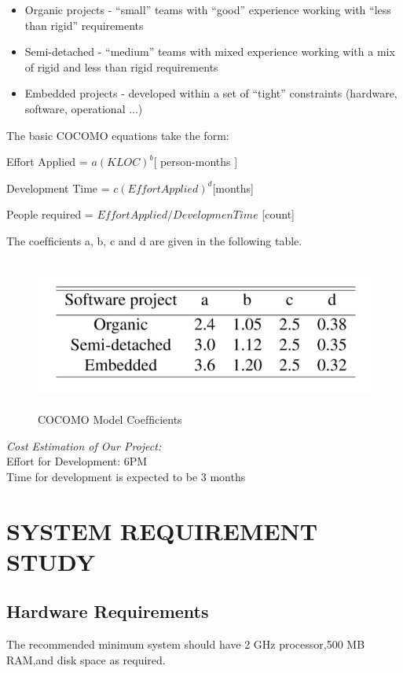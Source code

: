 \documentclass[12pt,a4paper,oneside]{report}
\newcommand{\quotes}[1]{``#1''}
\begin{document}
\begin{itemize}
\item Organic projects - \quotes{small} teams with \quotes{good} experience working with \quotes{less than rigid} requirements
\item Semi-detached - \quotes{medium} teams with mixed experience working with a mix of rigid and less than rigid requirements
\item Embedded projects - developed within a set of \quotes{tight} constraints (hardware, software, operational ...)
\end{itemize}
\par The basic COCOMO equations take the form:\\ 
\par Effort Applied = $a(KLOC)^b$[ person-months ]\\
\par Development Time = $c(EffortApplied)^d$[months]\\
\par People required = $Effort Applied / Developmen Time$ [count]\\
\par The coefﬁcients a, b, c and d are given in the following table.\\
\begin{figure}[h]
	\begin{center}
		\includegraphics[width=13cm,height=5cm]{cocomotable.jpg}
			\caption{ COCOMO Model Coefﬁcients}
			\label{ COCOMO Model Coefﬁcients}
	\end{center}
\end{figure}
\textit{Cost Estimation of Our Project:}\\
Effort for Development: 6PM \\
Time for development is expected to be 3 months\\
\section{SYSTEM REQUIREMENT STUDY}
\subsection{ Hardware Requirements}
\par The recommended minimum system should have 2 GHz processor,500 MB RAM,and disk space as required.\\
\end{document}
